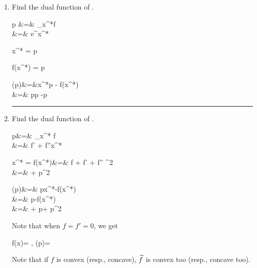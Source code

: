 \begin{enumerate}
\item
Find the dual function of
\beq
{}
\;.
\eeq

\beqa
p &=& \partial_{x^*}f
\\
&=&
e^{x^*}
\eeqa

\beq
x^* = \ln  p
\eeq

\beq
f(x^*) = p
\eeq

\beqa
{}(p)&=&x^*p - f(x^*)
\\
&=&
p\ln p -p
\eeqa



\hrule
\item 
Find the dual function of
\beq
{}
\;.
\eeq

\beqa
p&=&
\partial_{x^*} f
\\
&=&
f' + f''x^*
\label{eq-p-xstar}
\eeqa

\beq
x^* = 
\eeq
\beqa
f(x^*)&=& f
+
f' 
+
f''
^2
\\
&=&
+
p^2
\eeqa

\beqa
{}(p)&=&
px^*-f(x^*)
\\
&=&
p
-f(x^*)
\\
&=&
+
p
+
p^2
\eeqa

Note that when $f=f'=0$,
we get 

\beq
f(x)= 
,\quad 
{}(p)= 
\eeq

Note that if $f$ is convex
(resp., concave), ${\widetilde{f}}$
is convex too (resp., concave too).

%
%
%
%


\end{enumerate}
